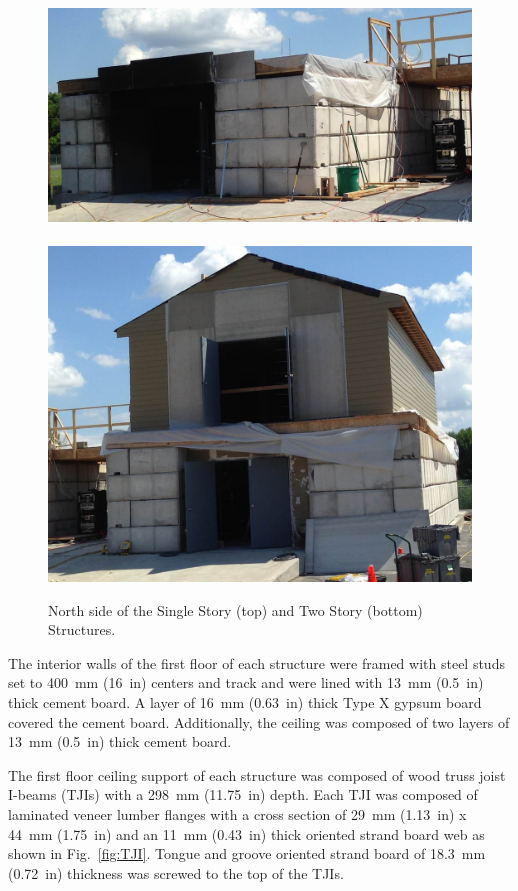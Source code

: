 \documentclass[12pt,oneside]{book}
\begin{document}
\begin{figure}[!ht]
	\includegraphics[width=5.25in]{../Figures/Pictures/east_structure}
	\\~\\
	\includegraphics[width=5.25in]{../Figures/Pictures/west_structure}
	\caption[North side of the Single Story and Two Story Structures.]{North side of the Single Story (top) and Two Story (bottom) Structures.}
	\label{fig:struct_pics}
\end{figure}

The interior walls of the first floor of each structure were framed with steel studs set to 400~mm (16~in) centers and track and were lined with 13~mm (0.5~in) thick cement board. A layer of 16~mm (0.63~in) thick Type X gypsum board covered the cement board. Additionally, the ceiling was composed of two layers of 13~mm (0.5~in) thick cement board.
\FloatBarrier

The first floor ceiling support of each structure was composed of wood truss joist I-beams (TJIs) with a 298~mm (11.75~in) depth. Each TJI was composed of laminated veneer lumber flanges with a cross section of 29~mm (1.13~in) x 44~mm (1.75~in) and an 11~mm (0.43~in) thick oriented strand board web as shown in Fig.~\ref{fig:TJI}. Tongue and groove oriented strand board of 18.3~mm (0.72~in) thickness was screwed to the top of the TJIs.
\end{document}
